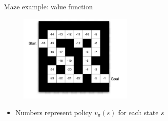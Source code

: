 \bgroup
\begin{frame}{Maze example: value function}
\begin{figure}
\centering
\includegraphics[width=0.5\textwidth]{img/maze_value.pdf}
\end{figure}
\begin{itemize}
\item Numbers represent policy $v_{\pi}(s)$ for each state $s$
\end{itemize}
\end{frame}
\egroup